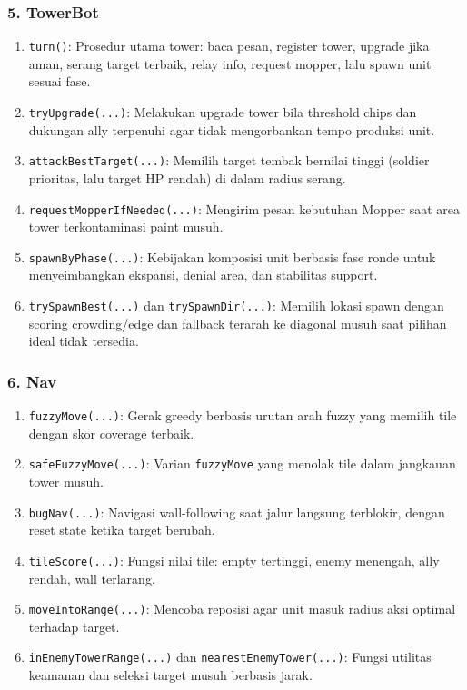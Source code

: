 \subsubsection{5. TowerBot}
\begin{enumerate}
	\item \texttt{turn()}:
	      Prosedur utama tower: baca pesan, register tower, upgrade jika aman, serang target terbaik, relay info, request mopper, lalu spawn unit sesuai fase.

	\item \texttt{tryUpgrade(...)}:
	      Melakukan upgrade tower bila threshold chips dan dukungan ally terpenuhi agar tidak mengorbankan tempo produksi unit.

	\item \texttt{attackBestTarget(...)}:
	      Memilih target tembak bernilai tinggi (soldier prioritas, lalu target HP rendah) di dalam radius serang.

	\item \texttt{requestMopperIfNeeded(...)}:
	      Mengirim pesan kebutuhan Mopper saat area tower terkontaminasi paint musuh.

	\item \texttt{spawnByPhase(...)}:
	      Kebijakan komposisi unit berbasis fase ronde untuk menyeimbangkan ekspansi, denial area, dan stabilitas support.

	\item \texttt{trySpawnBest(...)} dan \texttt{trySpawnDir(...)}:
	      Memilih lokasi spawn dengan scoring crowding/edge dan fallback terarah ke diagonal musuh saat pilihan ideal tidak tersedia.
\end{enumerate}

\subsubsection{6. Nav}
\begin{enumerate}
	\item \texttt{fuzzyMove(...)}:
	      Gerak greedy berbasis urutan arah fuzzy yang memilih tile dengan skor coverage terbaik.

	\item \texttt{safeFuzzyMove(...)}:
	      Varian \texttt{fuzzyMove} yang menolak tile dalam jangkauan tower musuh.

	\item \texttt{bugNav(...)}:
	      Navigasi wall-following saat jalur langsung terblokir, dengan reset state ketika target berubah.

	\item \texttt{tileScore(...)}:
	      Fungsi nilai tile: empty tertinggi, enemy menengah, ally rendah, wall terlarang.

	\item \texttt{moveIntoRange(...)}:
	      Mencoba reposisi agar unit masuk radius aksi optimal terhadap target.

	\item \texttt{inEnemyTowerRange(...)} dan \texttt{nearestEnemyTower(...)}:
	      Fungsi utilitas keamanan dan seleksi target musuh berbasis jarak.
\end{enumerate}

